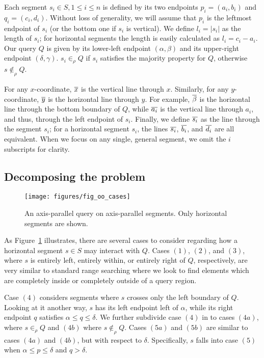 Each segment $s_i \in S, 1 \leq i \leq n$ is defined by its two endpoints $p_i = (a_i, b_i)$ and $q_i = (c_i, d_i)$. Without loss of generality, we will assume that $p_i$ is the leftmost endpoint of $s_i$ (or the bottom one if $s_i$ is vertical). We define $l_i = |s_i|$ as the length of $s_i$; for horizontal segments the length is easily calculated as $l_i = c_i - a_i$. Our query $Q$ is given by its lower-left endpoint $(\alpha, \beta)$ and its upper-right endpoint $(\delta, \gamma)$. $s_i \in_\rho Q$ if $s_i$ satisfies the majority property for $Q$, otherwise $s \not \in_\rho Q$.

For any $x$-coordinate, $\overline{x}$ is the vertical line through $x$. Similarly, for any $y$-coordinate, $\overline{y}$ is the horizontal line through $y$. For example, $\overline{\beta}$ is the horizontal line through the bottom boundary of $Q$, while $\overline{a_i}$ is the vertical line through $a_i$, and thus, through the left endpoint of $s_i$. Finally, we define $\overline{s_i}$ as the line through the segment $s_i$; for a horizontal segment $s_i$, the lines $\overline{s_i}$, $\overline{b_i}$, and $\overline{d_i}$ are all equivalent. When we focus on any single, general segment, we omit the $i$ subscripts for clarity.


\subsection{Decomposing the problem}
\label{:rectangles:ap:approach}

\begin{figure}
\centering
\texttt{[image: figures/fig\_oo\_cases]}
\caption[The different cases of axis-parallel segments]{An axis-parallel query on axis-parallel segments. Only horizontal segments are shown.}
\label{:fig:rectangles:ap:cases}
\end{figure}

As Figure~\ref{:fig:rectangles:ap:cases} illustrates, there are several cases to consider regarding how a horizontal segment $s \in S$ may interact with $Q$. Cases $(1)$, $(2)$, and $(3)$, where $s$ is entirely left, entirely within, or entirely right of $Q$, respectively, are very similar to standard range searching where we look to find elements which are completely inside or completely outside of a query region.  

Case $(4)$ considers segments where $s$ crosses only the left boundary of $Q$. Looking at it another way, $s$ has its left endpoint left of $\alpha$, while its right endpoint $q$ satisfies $\alpha \leq q \leq \delta$.  We further subdivide case $(4)$ in to cases $(4a)$, where $s \in_\rho Q$ and $(4b)$ where $s \not \in_\rho Q$.  Cases $(5a)$ and $(5b)$ are similar to cases $(4a)$ and $(4b)$, but with respect to $\delta$. Specifically, $s$ falls into case $(5)$ when $\alpha \leq p \leq \delta$ and $q > \delta$. 

